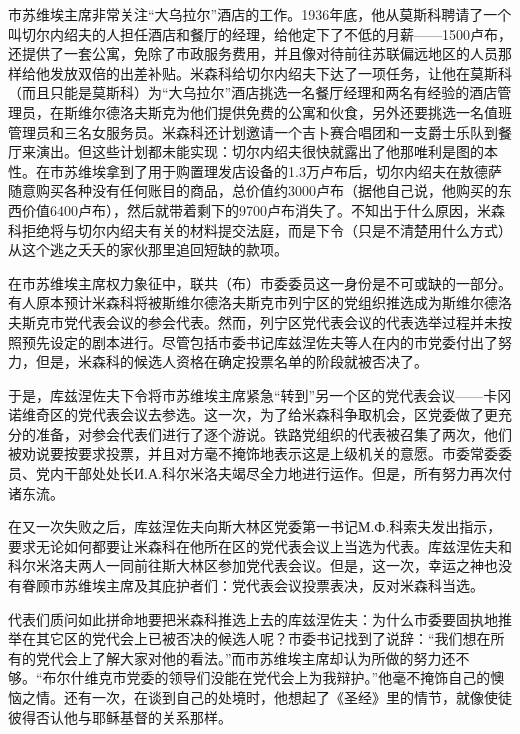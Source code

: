 市苏维埃主席非常关注“大乌拉尔”酒店的工作。1936年底，他从莫斯科聘请了一个叫切尔内绍夫的人担任酒店和餐厅的经理，给他定下了不低的月薪——1500卢布，还提供了一套公寓，免除了市政服务费用，并且像对待前往苏联偏远地区的人员那样给他发放双倍的出差补贴。米森科给切尔内绍夫下达了一项任务，让他在莫斯科（而且只能是莫斯科）为“大乌拉尔”酒店挑选一名餐厅经理和两名有经验的酒店管理员，在斯维尔德洛夫斯克为他们提供免费的公寓和伙食，另外还要挑选一名值班管理员和三名女服务员。米森科还计划邀请一个吉卜赛合唱团和一支爵士乐队到餐厅来演出。但这些计划都未能实现：切尔内绍夫很快就露出了他那唯利是图的本性。在市苏维埃拿到了用于购置理发店设备的1.3万卢布后，切尔内绍夫在敖德萨随意购买各种没有任何账目的商品，总价值约3000卢布（据他自己说，他购买的东西价值6400卢布），然后就带着剩下的9700卢布消失了。不知出于什么原因，米森科拒绝将与切尔内绍夫有关的材料提交法庭，而是下令（只是不清楚用什么方式）从这个逃之夭夭的家伙那里追回短缺的款项。

在市苏维埃主席权力象征中，联共（布）市委委员这一身份是不可或缺的一部分。有人原本预计米森科将被斯维尔德洛夫斯克市列宁区的党组织推选成为斯维尔德洛夫斯克市党代表会议的参会代表。然而，列宁区党代表会议的代表选举过程并未按照预先设定的剧本进行。尽管包括市委书记库兹涅佐夫等人在内的市党委付出了努力，但是，米森科的候选人资格在确定投票名单的阶段就被否决了。

于是，库兹涅佐夫下令将市苏维埃主席紧急“转到”另一个区的党代表会议——卡冈诺维奇区的党代表会议去参选。这一次，为了给米森科争取机会，区党委做了更充分的准备，对参会代表们进行了逐个游说。铁路党组织的代表被召集了两次，他们被劝说要按要求投票，并且对方毫不掩饰地表示这是上级机关的意愿。市委常委委员、党内干部处处长И.А.科尔米洛夫竭尽全力地进行运作。但是，所有努力再次付诸东流。

在又一次失败之后，库兹涅佐夫向斯大林区党委第一书记М.Ф.科索夫发出指示，要求无论如何都要让米森科在他所在区的党代表会议上当选为代表。库兹涅佐夫和科尔米洛夫两人一同前往斯大林区参加党代表会议。但是，这一次，幸运之神也没有眷顾市苏维埃主席及其庇护者们：党代表会议投票表决，反对米森科当选。

代表们质问如此拼命地要把米森科推选上去的库兹涅佐夫：为什么市委要固执地推举在其它区的党代会上已被否决的候选人呢？市委书记找到了说辞：“我们想在所有的党代会上了解大家对他的看法。”而市苏维埃主席却认为所做的努力还不够。“布尔什维克市党委的领导们没能在党代会上为我辩护。”他毫不掩饰自己的懊恼之情。还有一次，在谈到自己的处境时，他想起了《圣经》里的情节，就像使徒彼得否认他与耶稣基督的关系那样。

